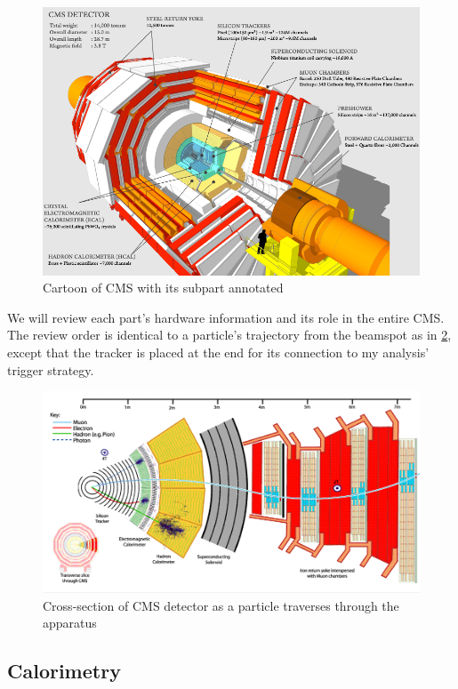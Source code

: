 \begin{figure}[h!]
	\caption{Cartoon of CMS with its subpart annotated \cite{xsec}}
  \label{fig:CMS}
  \centering
  \includegraphics[width=0.87\linewidth]{figs/CMS.png}
\end{figure}
We will review each part's hardware information and its role in the entire CMS.
The review order is identical to a particle's trajectory from the beamspot as in \ref{fig:cmsxsec}, except that the tracker is placed at the end for its connection to my analysis' trigger strategy.
\begin{figure}[h!]
  \caption{Cross-section of CMS detector as a particle traverses through the apparatus \cite{xsec}}
  \label{fig:cmsxsec}
  \centering
  \includegraphics[width=0.87\linewidth]{figs/cmsxsec.png}
\end{figure}
\subsection{Calorimetry}
